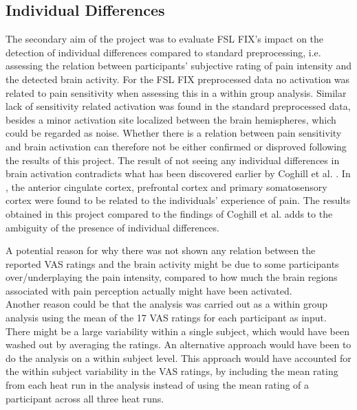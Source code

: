 \subsection*{Individual Differences}
The secondary aim of the project was to evaluate FSL FIX’s impact on the detection of individual differences compared to standard preprocessing, i.e. assessing the relation between participants’ subjective rating of pain intensity and the detected brain activity.
For the FSL FIX preprocessed data no activation was related to pain sensitivity when assessing this in a within group analysis. Similar lack of sensitivity related activation was found in the standard preprocessed data, besides a minor activation site localized between the brain hemispheres, which could be regarded as noise. Whether there is a relation between pain sensitivity and brain activation can therefore not be either confirmed or disproved following the results of this project. The result
of not seeing any individual differences in brain activation contradicts what has been discovered earlier by Coghill et al. \cite{Coghill2003}. In \cite{Coghill2003}, the anterior cingulate cortex, prefrontal cortex and primary somatosensory cortex were found to be related to the individuals' experience of pain. The results obtained in this project compared to the findings of Coghill et al. adds to the ambiguity of the presence of individual differences.    

A potential reason for why there was not shown any relation between the reported VAS ratings and the brain activity might be due to some participants over/underplaying the pain intensity, compared to how much the brain regions associated with pain perception actually might have been activated. \\
Another reason could be that the analysis was carried out as a within group analysis using the mean of the 17 VAS ratings for each participant as input. There might be a large variability within a single subject, which would have been washed out by averaging the ratings. An alternative approach would have been to do the analysis on a within subject level. This approach would have accounted for the within subject variability in the VAS ratings, by including the mean rating from each heat run in the analysis instead of using the mean rating of a participant across all three heat runs. 

